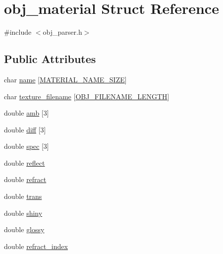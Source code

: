 \hypertarget{structobj__material}{\section{obj\+\_\+material Struct Reference}
\label{structobj__material}
}


{\ttfamily \#include $<$obj\+\_\+parser.\+h$>$}

\subsection*{Public Attributes}
\begin{DoxyCompactItemize}
\item 
char \hyperlink{structobj__material_a22c868555082c2637cef0515b5a7ca6b}{name} \mbox{[}\hyperlink{obj__parser_8h_a53bd7fc7d462768218868231597d3ac7}{M\+A\+T\+E\+R\+I\+A\+L\+\_\+\+N\+A\+M\+E\+\_\+\+S\+I\+Z\+E}\mbox{]}
\item 
char \hyperlink{structobj__material_a432c6437ac6a50152c553684fab0aaef}{texture\+\_\+filename} \mbox{[}\hyperlink{obj__parser_8h_a75e6857d3610a75bc56591ab64210fc0}{O\+B\+J\+\_\+\+F\+I\+L\+E\+N\+A\+M\+E\+\_\+\+L\+E\+N\+G\+T\+H}\mbox{]}
\item 
double \hyperlink{structobj__material_a0127f4464e685658f8bf9db697688f8d}{amb} \mbox{[}3\mbox{]}
\item 
double \hyperlink{structobj__material_a6f9b724555e48815e800b4f82c291f19}{diff} \mbox{[}3\mbox{]}
\item 
double \hyperlink{structobj__material_aaba883a6684bc146f396a39534e5ae57}{spec} \mbox{[}3\mbox{]}
\item 
double \hyperlink{structobj__material_a4763ba95918c9bf5256b79e3603adc58}{reflect}
\item 
double \hyperlink{structobj__material_a322daa5a65bd76d646dea59bf93e29c0}{refract}
\item 
double \hyperlink{structobj__material_adfe718fbbdb972e83b4159d4c634b14b}{trans}
\item 
double \hyperlink{structobj__material_aa238fbf38e7eadb10ceed02324213d5d}{shiny}
\item 
double \hyperlink{structobj__material_a9d648bad424ee96576ed2a2f2e604da6}{glossy}
\item 
double \hyperlink{structobj__material_a6931b83a6b1e681d094751258189259b}{refract\+\_\+index}
\end{DoxyCompactItemize}


